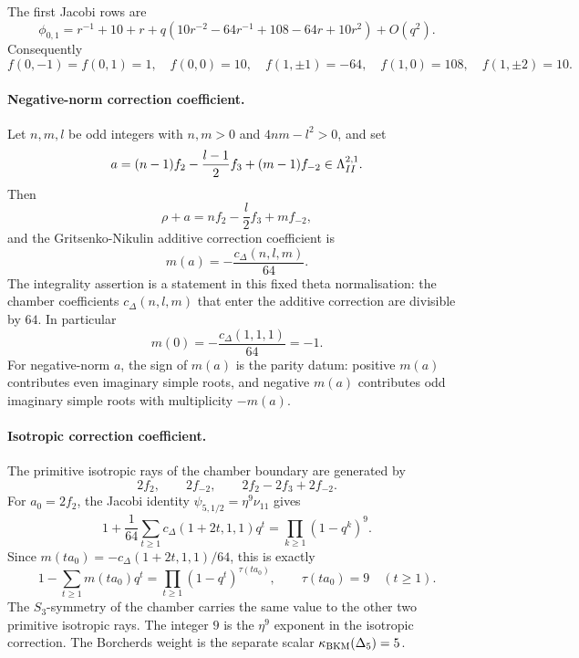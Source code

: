 The first Jacobi rows are
\[
  \phi_{0,1}
  =
  r^{-1}+10+r
  +q(10r^{-2}-64r^{-1}+108-64r+10r^2)+O(q^2).
\]
Consequently
\[
  f(0,-1)=f(0,1)=1,\quad f(0,0)=10,
  \quad f(1,\pm1)=-64,\quad f(1,0)=108,\quad
  f(1,\pm2)=10.
\]

\paragraph{Negative-norm correction coefficient.}
Let \(n,m,l\) be odd integers with \(n,m>0\) and \(4nm-l^2>0\), and set
\[
  a=(n-1)f_2-\frac{l-1}{2}f_3+(m-1)f_{-2}\in\Lambda^{2,1}_{II}.
\]
Then
\[
  \rho+a=n f_2-\frac l2f_3+m f_{-2},
\]
and the Gritsenko-Nikulin additive correction coefficient is
\[
  m(a)=-\frac{c_\Delta(n,l,m)}{64}.
\]
The integrality assertion is a statement in this fixed theta
normalisation: the chamber coefficients \(c_\Delta(n,l,m)\) that enter
the additive correction are divisible by \(64\). In particular
\[
  m(0)=-\frac{c_\Delta(1,1,1)}{64}=-1.
\]
For negative-norm \(a\), the sign of \(m(a)\) is the parity datum:
positive \(m(a)\) contributes even imaginary simple roots, and negative
\(m(a)\) contributes odd imaginary simple roots with multiplicity
\(-m(a)\).

\paragraph{Isotropic correction coefficient.}
The primitive isotropic rays of the chamber boundary are generated by
\[
  2f_2,\qquad 2f_{-2},\qquad 2f_2-2f_3+2f_{-2}.
\]
For \(a_0=2f_2\), the Jacobi identity
\(\psi_{5,1/2}=\eta^9\nu_{11}\) gives
\[
  1+\frac{1}{64}\sum_{t\geq1}c_\Delta(1+2t,1,1)q^t
  =
  \prod_{k\geq1}(1-q^k)^9 .
\]
Since \(m(t a_0)=-c_\Delta(1+2t,1,1)/64\), this is exactly
\[
  1-\sum_{t\geq1}m(t a_0)q^t
  =
  \prod_{t\geq1}(1-q^t)^{\tau(t a_0)},
  \qquad
  \tau(t a_0)=9\quad(t\geq1).
\]
The \(S_3\)-symmetry of the chamber carries the same value to the other
two primitive isotropic rays. The integer \(9\) is the \(\eta^9\)
exponent in the isotropic correction. The Borcherds weight is the
separate scalar \(\kappa_{\mathrm{BKM}}(\Delta_5)=5\).

